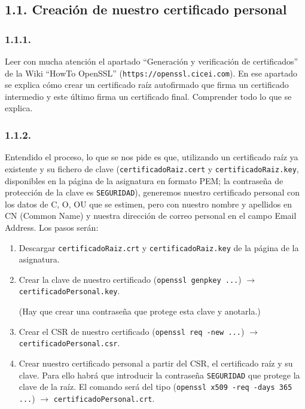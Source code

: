 \subsection*{1.1. Creación de nuestro certificado personal}

\subsubsection*{1.1.1.}
Leer con mucha atención el apartado ``Generación y verificación de certificados'' de la Wiki ``HowTo OpenSSL''
(\texttt{https://openssl.cicei.com}). En ese apartado se explica cómo crear un certificado raíz autofirmado que
firma un certificado intermedio y este último firma un certificado final. Comprender todo lo que se explica.

\subsubsection*{1.1.2.}
Entendido el proceso, lo que se nos pide es que, utilizando un certificado raíz ya existente y su fichero de clave
(\texttt{certificadoRaiz.cert} y \texttt{certificadoRaiz.key}, disponibles en la página de la asignatura en formato
PEM; la contraseña de protección de la clave es \texttt{SEGURIDAD}), generemos nuestro certificado personal con
los datos de C, O, OU que se estimen, pero con nuestro nombre y apellidos en CN (Common Name) y nuestra
dirección de correo personal en el campo Email Address. Los pasos serán:

\begin{enumerate}[label=\alph*)]
    \item Descargar \texttt{certificadoRaiz.crt} y \texttt{certificadoRaiz.key} de la página de la asignatura.
    \item Crear la clave de nuestro certificado (\texttt{openssl genpkey ...}) $\rightarrow$ \texttt{certificadoPersonal.key}.

    (Hay que crear una contraseña que protege esta clave y anotarla.)

    \item Crear el CSR de nuestro certificado (\texttt{openssl req -new ...}) $\rightarrow$ \texttt{certificadoPersonal.csr}.
    \item Crear nuestro certificado personal a partir del CSR, el certificado raíz y su clave. Para ello habrá que
    introducir la contraseña \texttt{SEGURIDAD} que protege la clave de la raíz. El comando será del tipo
    (\texttt{openssl x509 -req -days 365 ...}) $\rightarrow$ \texttt{certificadoPersonal.crt}.
\end{enumerate}

